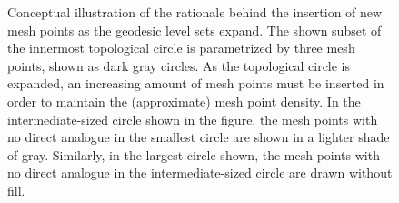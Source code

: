 \begin{figure}[htpb]
    \centering
    \resizebox{0.9\linewidth}{!}%
    {}
    \caption[Conceptual illustration of the rationale behind the insertion of
    new mesh points as the geodesic level sets expand]
    {Conceptual illustration of the rationale behind the insertion of new mesh
        points as the geodesic level sets expand. The shown subset of the
        innermost topological circle is parametrized by three mesh points,
        shown as dark gray circles. As the topological circle is expanded, an
        increasing amount of mesh points must be inserted in order to maintain
        the (approximate) mesh point density. In the intermediate-sized circle
        shown in the figure, the mesh points with no direct analogue in the
        smallest circle are shown in a lighter shade of gray. Similarly, in the
        largest circle shown, the mesh points with no direct analogue in the
        intermediate-sized circle are drawn without fill.
    }
    \label{fig:rationale_for_inserting_new_points}
\end{figure}


